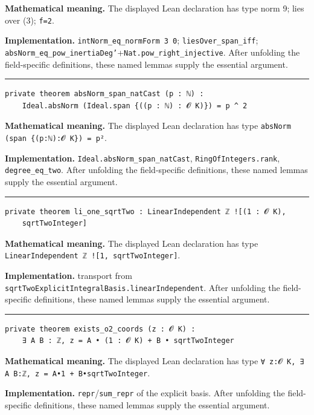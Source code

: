 \documentclass[UTF8,a4paper,11pt,fontset=fandol]{ctexart}
\theoremstyle{definition}
\newcommand{\statementsep}{\par\medskip\hrule\medskip}
\begin{document}
\noindent\textbf{Mathematical meaning.} The displayed Lean declaration has type norm 9; lies over (3); \texttt{f=2}.\par
\noindent\textbf{Implementation.} \texttt{intNorm\_\allowbreak{}eq\_\allowbreak{}normForm 3 0}; \texttt{liesOver\_\allowbreak{}span\_\allowbreak{}iff}; \texttt{absNorm\_\allowbreak{}eq\_\allowbreak{}pow\_\allowbreak{}inertiaDeg'}+\texttt{Nat.\allowbreak{}pow\_\allowbreak{}right\_\allowbreak{}injective}. After unfolding the field-specific definitions, these named lemmas supply the essential argument.\par
\statementsep
\begin{verbatim}
private theorem absNorm_span_natCast (p : ℕ) :
    Ideal.absNorm (Ideal.span {((p : ℕ) : 𝓞 K)}) = p ^ 2
\end{verbatim}
\noindent\textbf{Mathematical meaning.} The displayed Lean declaration has type \texttt{absNorm (span \{(p:ℕ):𝓞 K\}) = p²}.\par
\noindent\textbf{Implementation.} \texttt{Ideal.\allowbreak{}absNorm\_\allowbreak{}span\_\allowbreak{}natCast}, \texttt{RingOfIntegers.\allowbreak{}rank}, \texttt{degree\_\allowbreak{}eq\_\allowbreak{}two}. After unfolding the field-specific definitions, these named lemmas supply the essential argument.\par
\statementsep
\begin{verbatim}
private theorem li_one_sqrtTwo : LinearIndependent ℤ ![(1 : 𝓞 K),
    sqrtTwoInteger]
\end{verbatim}
\noindent\textbf{Mathematical meaning.} The displayed Lean declaration has type \texttt{LinearIndependent ℤ ![1, sqrtTwoInteger]}.\par
\noindent\textbf{Implementation.} transport from \texttt{sqrtTwoExplicitIntegralBasis.\allowbreak{}linearIndependent}. After unfolding the field-specific definitions, these named lemmas supply the essential argument.\par
\statementsep
\begin{verbatim}
private theorem exists_o2_coords (z : 𝓞 K) :
    ∃ A B : ℤ, z = A • (1 : 𝓞 K) + B • sqrtTwoInteger
\end{verbatim}
\noindent\textbf{Mathematical meaning.} The displayed Lean declaration has type \texttt{∀ z:𝓞 K, ∃ A B:ℤ, z = A•1 + B•sqrtTwoInteger}.\par
\noindent\textbf{Implementation.} \texttt{repr}/\texttt{sum\_\allowbreak{}repr} of the explicit basis. After unfolding the field-specific definitions, these named lemmas supply the essential argument.\par
\end{document}
